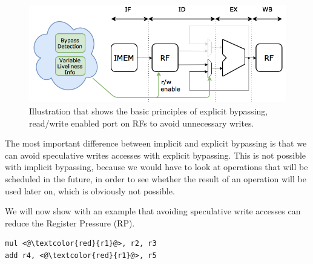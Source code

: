 \begin{figure}[b!]
\centering
\includegraphics[width=.7\textwidth]{figures/expl_bypassing_principle/02_explicit_bypassing_principle}
\caption{Illustration that shows the basic principles of explicit bypassing, read/write enabled port on RFs to avoid unnecessary writes.}
\label{fig:exp_bypass_principle_rw}
\end{figure}

The most important difference between implicit and explicit bypassing is that we can avoid speculative writes accesses with explicit bypassing. This is not possible with implicit bypassing, because we would have to look at operations that will be scheduled in the future, in order to see whether the result of an operation will be used later on, which is obviously not possible.

We will now show with an example that avoiding speculative write accesses can reduce the Register Pressure (RP).





\begin{lstlisting}[caption=Example code fragment where no bypassing is specified., label=nobypass]
mul <@\textcolor{red}{r1}@>, r2, r3
add r4, <@\textcolor{red}{r1}@>, r5
\end{lstlisting}

